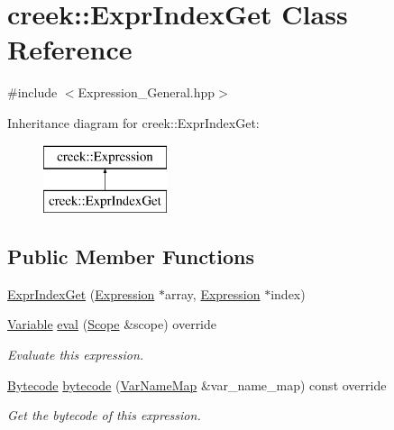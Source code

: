 \hypertarget{classcreek_1_1_expr_index_get}{}\section{creek\+:\+:Expr\+Index\+Get Class Reference}
\label{classcreek_1_1_expr_index_get}


{\ttfamily \#include $<$Expression\+\_\+\+General.\+hpp$>$}

Inheritance diagram for creek\+:\+:Expr\+Index\+Get\+:\begin{figure}[H]
\begin{center}
\leavevmode
\includegraphics[height=2.000000cm]{classcreek_1_1_expr_index_get}
\end{center}
\end{figure}
\subsection*{Public Member Functions}
\begin{DoxyCompactItemize}
\item 
\hyperlink{classcreek_1_1_expr_index_get_a750e9595ffa4daf3291c7fbe2ebcf12c}{Expr\+Index\+Get} (\hyperlink{classcreek_1_1_expression}{Expression} $\ast$array, \hyperlink{classcreek_1_1_expression}{Expression} $\ast$index)
\item 
\hyperlink{classcreek_1_1_variable}{Variable} \hyperlink{classcreek_1_1_expr_index_get_aa76e7e024f8c52560b222c0426c72e22}{eval} (\hyperlink{classcreek_1_1_scope}{Scope} \&scope) override
\begin{DoxyCompactList}\small\item\em Evaluate this expression. \end{DoxyCompactList}\item 
\hyperlink{classcreek_1_1_bytecode}{Bytecode} \hyperlink{classcreek_1_1_expr_index_get_aae7898b3c0dcc7d53baea6b63a297292}{bytecode} (\hyperlink{classcreek_1_1_var_name_map}{Var\+Name\+Map} \&var\+\_\+name\+\_\+map) const  override\hypertarget{classcreek_1_1_expr_index_get_aae7898b3c0dcc7d53baea6b63a297292}{}\label{classcreek_1_1_expr_index_get_aae7898b3c0dcc7d53baea6b63a297292}

\begin{DoxyCompactList}\small\item\em Get the bytecode of this expression. \end{DoxyCompactList}\end{DoxyCompactItemize}


